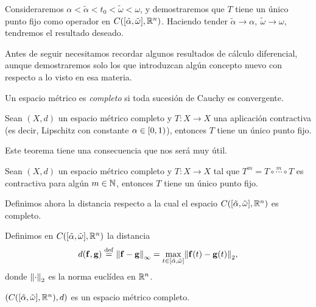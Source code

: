 \documentclass[../ecuaciones_diferenciales.tex]{subfiles}
\begin{document}
Consideraremos \(\alpha < \tilde{\alpha} < t_0 < \tilde{\omega} < \omega\), y
demostraremos que \(T\) tiene un único punto fijo como operador en
\(C([\tilde{\alpha}, \tilde{\omega}], \mathbb{R}^n)\). Haciendo tender \(\tilde{\alpha}
\to \alpha,\ \tilde{\omega} \to \omega\), tendremos el resultado deseado.

Antes de seguir necesitamos recordar algunos resultados de cálculo diferencial,
aunque demostraremos solo los que introduzcan algún concepto nuevo con respecto
a lo visto en esa materia.

\begin{definition}
	Un espacio métrico es \emph{completo} si toda sucesión de Cauchy es convergente.
\end{definition}

\begin{theorem}
	Sean \((X, d)\) un espacio métrico completo y \(T : X \to X\) una aplicación
	contractiva (es decir, Lipschitz con constante \(\alpha \in \closedopen{0}{1}\)),
	entonces \(T\) tiene un único punto fijo.
\end{theorem}

Este teorema tiene una consecuencia que nos será muy útil.

\begin{corollary}\label{cor:banach_fixed_point}
	Sean \((X, d)\) un espacio métrico completo y \(T : X \to X\) tal que
	\(T^m = T \circ \overset{m}{\cdots} \circ T\) es contractiva para algún
	\(m \in \mathbb{N}\), entonces \(T\) tiene un único punto fijo.
\end{corollary}

Definimos ahora la distancia respecto a la cual el espacio
\(C([\tilde{\alpha}, \tilde{\omega}], \mathbb{R}^n)\) es completo.

\begin{definition}
	Definimos en \(C([\tilde{\alpha}, \tilde{\omega}], \mathbb{R}^n)\) la distancia
	\[d(\vec{f}, \vec{g}) \eqdef \norm{\vec{f} - \vec{g}}_{\infty}
		= \max_{t \in [\tilde{\alpha}, \tilde{\omega}]}
			\norm{\vec{f}(t) - \vec{g}(t)}_2,\]
	donde \(\norm{\cdot}_2\) es la norma euclídea en \(\mathbb{R}^n\).
\end{definition}

\begin{proposition}
	\((C([\tilde{\alpha}, \tilde{\omega}], \mathbb{R}^n), d)\)
	es un espacio métrico completo.
\end{proposition}
\end{document}
